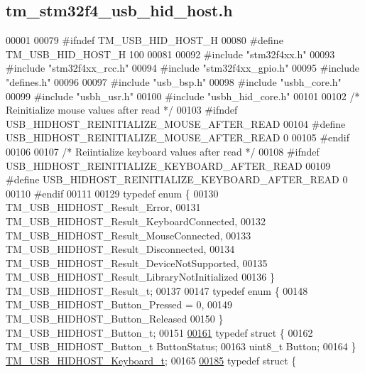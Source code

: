 \hypertarget{tm__stm32f4__usb__hid__host_8h_source}{}\subsection{tm\+\_\+stm32f4\+\_\+usb\+\_\+hid\+\_\+host.\+h}

\begin{DoxyCode}
00001 
00079 \textcolor{preprocessor}{#ifndef TM\_USB\_HID\_HOST\_H}
00080 \textcolor{preprocessor}{#define TM\_USB\_HID\_HOST\_H 100}
00081 
00092 \textcolor{preprocessor}{#include "stm32f4xx.h"}
00093 \textcolor{preprocessor}{#include "stm32f4xx\_rcc.h"}
00094 \textcolor{preprocessor}{#include "stm32f4xx\_gpio.h"}
00095 \textcolor{preprocessor}{#include "defines.h"}
00096 
00097 \textcolor{preprocessor}{#include "usb\_bsp.h"}
00098 \textcolor{preprocessor}{#include "usbh\_core.h"}
00099 \textcolor{preprocessor}{#include "usbh\_usr.h"}
00100 \textcolor{preprocessor}{#include "usbh\_hid\_core.h"}
00101 
00102 \textcolor{comment}{/* Reinitialize mouse values after read */}
00103 \textcolor{preprocessor}{#ifndef USB\_HIDHOST\_REINITIALIZE\_MOUSE\_AFTER\_READ}
00104 \textcolor{preprocessor}{#define USB\_HIDHOST\_REINITIALIZE\_MOUSE\_AFTER\_READ       0}
00105 \textcolor{preprocessor}{#endif}
00106 
00107 \textcolor{comment}{/* Reiintialize keyboard values after read */}
00108 \textcolor{preprocessor}{#ifndef USB\_HIDHOST\_REINITIALIZE\_KEYBOARD\_AFTER\_READ}
00109 \textcolor{preprocessor}{#define USB\_HIDHOST\_REINITIALIZE\_KEYBOARD\_AFTER\_READ    0}
00110 \textcolor{preprocessor}{#endif}
00111 
00129 \textcolor{keyword}{typedef} \textcolor{keyword}{enum} \{
00130     TM\_USB\_HIDHOST\_Result\_Error,
00131     TM\_USB\_HIDHOST\_Result\_KeyboardConnected,
00132     TM\_USB\_HIDHOST\_Result\_MouseConnected,
00133     TM\_USB\_HIDHOST\_Result\_Disconnected,
00134     TM\_USB\_HIDHOST\_Result\_DeviceNotSupported,
00135     TM\_USB\_HIDHOST\_Result\_LibraryNotInitialized
00136 \} TM\_USB\_HIDHOST\_Result\_t;
00137 
00147 \textcolor{keyword}{typedef} \textcolor{keyword}{enum} \{
00148     TM\_USB\_HIDHOST\_Button\_Pressed = 0,
00149     TM\_USB\_HIDHOST\_Button\_Released
00150 \} TM\_USB\_HIDHOST\_Button\_t;
00151 
\hypertarget{tm__stm32f4__usb__hid__host_8h_source_l00161}{}\hyperlink{struct_t_m___u_s_b___h_i_d_h_o_s_t___keyboard__t}{00161} \textcolor{keyword}{typedef} \textcolor{keyword}{struct }\{
00162     TM\_USB\_HIDHOST\_Button\_t ButtonStatus;
00163     uint8\_t Button;
00164 \} \hyperlink{struct_t_m___u_s_b___h_i_d_h_o_s_t___keyboard__t}{TM\_USB\_HIDHOST\_Keyboard\_t};
00165 
\hypertarget{tm__stm32f4__usb__hid__host_8h_source_l00185}{}\hyperlink{struct_t_m___u_s_b___h_i_d_h_o_s_t___mouse__t}{00185} \textcolor{keyword}{typedef} \textcolor{keyword}{struct }\{

\end{DoxyCode}
